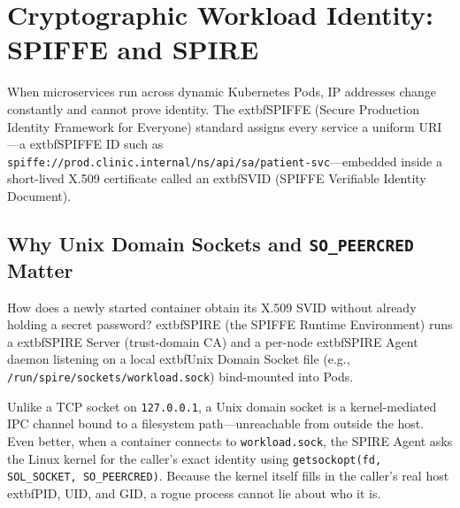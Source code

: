 \section{Cryptographic Workload Identity: SPIFFE and SPIRE}

When microservices run across dynamic Kubernetes Pods, IP addresses change constantly and cannot prove identity. The 	extbf{SPIFFE (Secure Production Identity Framework for Everyone)} standard assigns every service a uniform URI—a 	extbf{SPIFFE ID} such as \texttt{spiffe://prod.clinic.internal/ns/api/sa/patient-svc}—embedded inside a short-lived X.509 certificate called an 	extbf{SVID (SPIFFE Verifiable Identity Document)}.

\subsection{Why Unix Domain Sockets and \texttt{SO\_PEERCRED} Matter}
How does a newly started container obtain its X.509 SVID without already holding a secret password? 	extbf{SPIRE} (the SPIFFE Runtime Environment) runs a 	extbf{SPIRE Server} (trust-domain CA) and a per-node 	extbf{SPIRE Agent} daemon listening on a local 	extbf{Unix Domain Socket} file (e.g., \texttt{/run/spire/sockets/workload.sock}) bind-mounted into Pods.

Unlike a TCP socket on \texttt{127.0.0.1}, a Unix domain socket is a kernel-mediated IPC channel bound to a filesystem path—unreachable from outside the host. Even better, when a container connects to \texttt{workload.sock}, the SPIRE Agent asks the Linux kernel for the caller's exact identity using \texttt{getsockopt(fd, SOL\_SOCKET, SO\_PEERCRED)}. Because the kernel itself fills in the caller's real host 	extbf{PID, UID, and GID}, a rogue process cannot lie about who it is.

